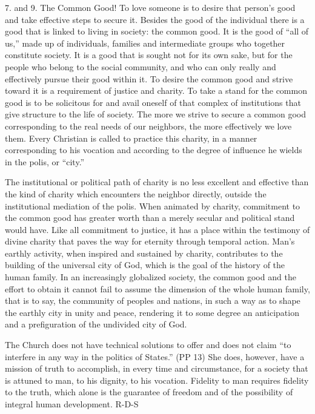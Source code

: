 \documentclass[oneside]{book}
\begin{document}
7. and 9. The Common Good! To love someone is to desire that person's good and
take effective steps to secure it. Besides the good of the individual there is a
good that is linked to living in society: the common good. It is the good of
``all of us,'' made up of individuals, families and intermediate groups who
together constitute society. It is a good that is sought not for its own sake,
but for the people who belong to the social community, and who can only really
and effectively pursue their good within it. To desire the common good and
strive toward it is a requirement of justice and charity. To take a stand for
the common good is to be solicitous for and avail oneself of that complex of
institutions that give structure to the life of society. The more we strive to
secure a common good corresponding to the real needs of our neighbors, the more
effectively we love them. Every Christian is called to practice this charity, in
a manner corresponding to his vocation and according to the degree of influence
he wields in the polis, or ``city.''

The institutional or political path of charity is no less excellent and
effective than the kind of charity which encounters the neighbor directly,
outside the institutional mediation of the polis. When animated by charity,
commitment to the common good has greater worth than a merely secular and
political stand would have. Like all commitment to justice, it has a place
within the testimony of divine charity that paves the way for eternity through
temporal action. Man's earthly activity, when inspired and sustained by charity,
contributes to the building of the universal city of God, which is the goal of
the history of the human family. In an increasingly globalized society, the
common good and the effort to obtain it cannot fail to assume the dimension of
the whole human family, that is to say, the community of peoples and nations, in
such a way as to shape the earthly city in unity and peace, rendering it to some
degree an anticipation and a prefiguration of the undivided city of God.

The Church does not have technical solutions to offer and does not claim ``to
interfere in any way in the politics of States.'' (PP 13) She does, however,
have a mission of truth to accomplish, in every time and circumstance, for a
society that is attuned to man, to his dignity, to his vocation. Fidelity to man
requires fidelity to the truth, which alone is the guarantee of freedom and of
the possibility of integral human development.
R-D-S
\end{document}
